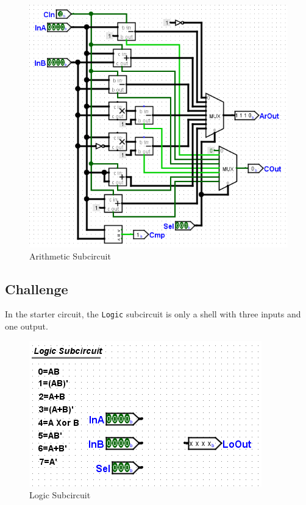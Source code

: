 \begin{figure}[H]
	\centering
	\includegraphics[width=\maxwidth{.95\linewidth}]{gfx/alu-03}
	\caption{Arithmetic Subcircuit}
	\label{fig:alu-03}
\end{figure}

\subsection{Challenge}

In the starter circuit, the \lstinline[columns=fixed]|Logic| subcircuit is only a shell with three inputs and one output.

\begin{figure}[H]
	\centering
	\includegraphics[width=\maxwidth{.95\linewidth}]{gfx/alu-04}
	\caption{Logic Subcircuit}
	\label{fig:alu-04}
\end{figure}

